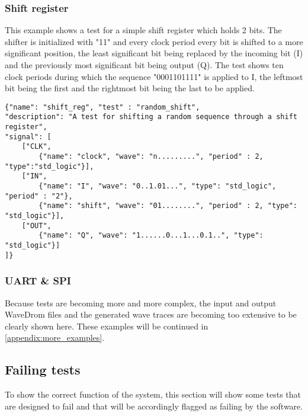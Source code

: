 \subsubsection{Shift register}\label{example:shift}
This example shows a test for a simple shift register which holds 2 bits. The shifter is initialized with "11" and every clock period every bit is shifted to a more significant position, the least significant bit being replaced by the incoming bit (I) and the previously most significant bit being output (Q). The test shows ten clock periods during which the sequence "0001101111" is applied to I, the leftmost bit being the first and the rightmost bit being the last to be applied.
\begin{lstlisting}[style=json, caption={Functionality test for the shifter design in appendix \ref{appendix:shifter}}, label={json:shifter_result}]
{"name": "shift_reg", "test" : "random_shift", 
"description": "A test for shifting a random sequence through a shift register", 
"signal": [
	["CLK",
		{"name": "clock", "wave": "n.........", "period" : 2, "type":"std_logic"}],
	["IN",
		{"name": "I", "wave": "0..1.01...", "type": "std_logic", "period" : "2"},
		{"name": "shift", "wave": "01........", "period" : 2, "type": "std_logic"}],
	["OUT",
		{"name": "Q", "wave": "1......0...1...0.1..", "type": "std_logic"}]
]}
\end{lstlisting}
\subsubsection{UART \& SPI}
Because tests are becoming more and more complex, the input and output WaveDrom files and the generated wave traces are becoming too extensive to be clearly shown here. These examples will be continued in \ref{appendix:more_examples}.
\subsection{Failing tests}
To show the correct function of the system, this section will show some tests that are designed to fail and that will be accordingly flagged as failing by the software.
